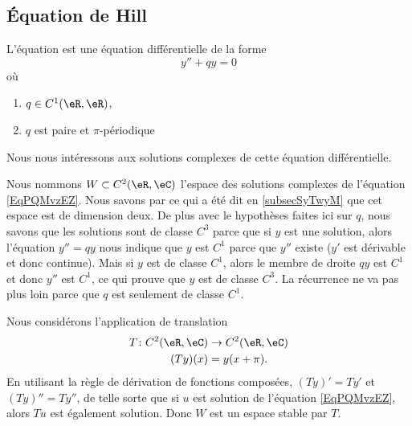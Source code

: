 \subsection{Équation de Hill}
\label{SubSecDWwVVPa}

L'équation  est une équation différentielle de la forme 
\begin{equation}    \label{EqPQMvzEZ}
    y''+qy=0
\end{equation}
où
\begin{enumerate}
    \item
        \( q\in C^1(\eR,\eR)\),
    \item
        \( q\) est paire et \( \pi\)-périodique
\end{enumerate}
Nous nous intéressons aux solutions complexes de cette équation différentielle.

Nous nommons \( W\subset C^2(\eR,\eC)\) l'espace des solutions complexes de l'équation \eqref{EqPQMvzEZ}. Nous savons par ce qui a été dit en \ref{subsecSyTwyM} que cet espace est de dimension deux. De plus avec le hypothèses faites ici sur \( q\), nous savons que les solutions sont de classe $C^3$ parce que si \( y\) est une solution, alors l'équation \( y''=qy\) nous indique que \( y\) est \( C^1\) parce que \( y''\) existe (\( y'\) est dérivable et donc continue). Mais si \( y\) est de classe \( C^1\), alors le membre de droite \( qy\) est \( C^1\) et donc \( y''\) est \( C^1\), ce qui prouve que \( y\) est de classe \( C^3\). La récurrence ne va pas plus loin parce que \( q\) est seulement de classe \( C^1\).

Nous considérons l'application de translation
\begin{equation}
    \begin{aligned}
        T\colon C^2(\eR,\eC)&\to C^2(\eR,\eC) \\
        (Ty)(x)&=y(x+\pi). 
    \end{aligned}
\end{equation}
En utilisant la règle de dérivation de fonctions composées, \( (Ty)'=Ty'\) et \( (Ty)''=Ty''\), de telle sorte que si \( u\) est solution de l'équation \eqref{EqPQMvzEZ}, alors \( Tu\) est également solution. Donc \( W\) est un espace stable par \( T\).

